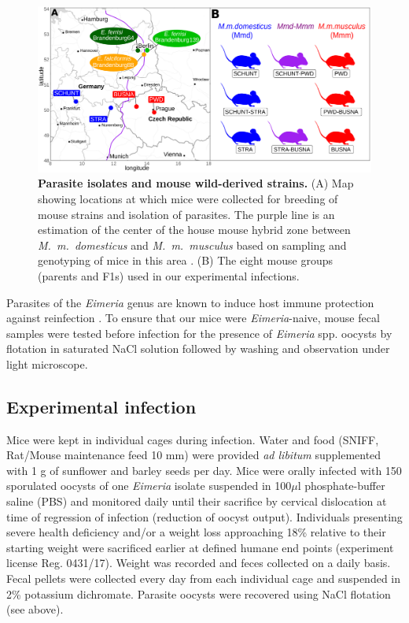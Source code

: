 \begin{figure}[H]
    \centering
    \includegraphics[width=\linewidth,height=\textheight,keepaspectratio]{images/3article2/Fig1_final.pdf}
    \caption{\textbf{Parasite isolates and mouse wild-derived strains.} (A) Map showing locations at which mice were collected for breeding of mouse strains and isolation of parasites. The purple line is an estimation of the center of the house mouse hybrid zone between \textit{M.~m.~domesticus} and \textit{M.~m.~musculus} based on sampling and genotyping of mice in this area \citep{Balard2020, dureje_mouse_2012, macholan_widespread_2019}. (B) The eight mouse groups (parents and F1s) used in our experimental infections.}
\end{figure}

Parasites of the \textit{Eimeria }genus are known to induce host immune protection against reinfection \citep{rose_immune_1992, smith_genetic_2000}. To ensure that our mice were \textit{Eimeria}-naive, mouse fecal samples were tested before infection for the presence of \textit{Eimeria }spp. oocysts by flotation in saturated NaCl solution followed by washing and observation under light microscope. \par

\subsection{Experimental infection}

Mice were kept in individual cages during infection. Water and food (SNIFF, Rat/Mouse maintenance feed 10 mm) were provided \textit{ad libitum} supplemented with 1 g of sunflower and barley seeds per day. Mice were orally infected with 150 sporulated oocysts of one \textit{Eimeria }isolate suspended in 100$\mu$l phosphate-buffer saline (PBS) and monitored daily until their sacrifice by cervical dislocation at time of regression of infection (reduction of oocyst output). Individuals presenting severe health deficiency and/or a weight loss approaching 18\% relative to their starting weight were sacrificed earlier at defined humane end points (experiment license Reg. 0431/17). Weight was recorded and feces collected on a daily basis. Fecal pellets were collected every day from each individual cage and suspended in 2\% potassium dichromate. Parasite oocysts were recovered using NaCl flotation (see above). \par

